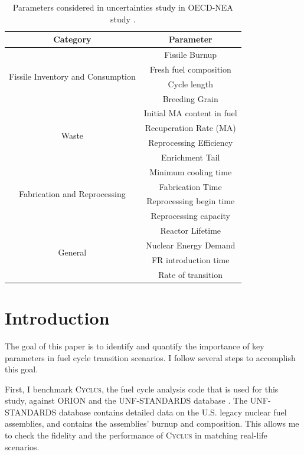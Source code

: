 \documentclass{article}
\newcommand{\Cyclus}{\textsc{Cyclus}\xspace}%
\begin{document}
\begin{table}[h]
    \centering
    \caption{Parameters considered in uncertainties study 
             in OECD-NEA study \cite{hyland_effects_2015}.}
    \begin{tabular}{cc}
        \hline
        \textbf{Category} & \textbf{Parameter} \\ \hline
        \multirow{4}{*}{Fissile Inventory and Consumption} & Fissile Burnup \\
         & Fresh fuel composition \\
         & Cycle length \\
         & Breeding Grain\\ \hline
        \multirow{4}{*}{Waste} & Initial \gls{MA} content in fuel \\
         & Recuperation Rate (MA) \\
         & Reprocessing Efficiency \\
         & Enrichment Tail \\ \hline
        \multirow{4}{*}{Fabrication and Reprocessing} & Minimum cooling time \\
        & Fabrication Time\\
        & Reprocessing begin time\\
        & Reprocessing capacity\\ \hline
        \multirow{4}{*}{General} & Reactor Lifetime\\
        & Nuclear Energy Demand \\
        & FR introduction time \\
        & Rate of transition \\ \hline
    \end{tabular}
\end{table}





\section{Introduction}

The goal of this paper is to identify and quantify the 
importance of key parameters in fuel cycle transition scenarios.
I follow several steps to accomplish this goal.

First, I benchmark \Cyclus, the fuel cycle analysis code that is used for this study,
against ORION \cite{gregg_analysis_2012} and the \gls{UNF-STANDARDS} database
\cite{peterson_used_2013}. The \gls{UNF-STANDARDS} database contains detailed
data on the U.S. legacy nuclear fuel assemblies, and contains the
assemblies' burnup and composition. This allows me to check the fidelity
and the performance of \Cyclus in matching real-life scenarios.
\end{document}
